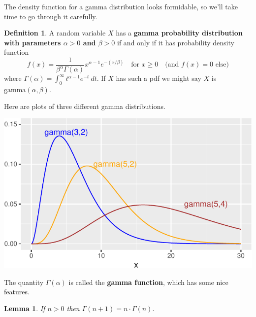 \documentclass[
]{book}
\newtheorem{lemma}{Lemma}[chapter]
\theoremstyle{definition}
\newtheorem{definition}{Definition}[chapter]
\theoremstyle{definition}
\theoremstyle{definition}
\theoremstyle{definition}
\theoremstyle{remark}
\begin{document}
The density function for a gamma distribution looks formidable, so we'll take time to go through it carefully.

\begin{definition}
\protect\hypertarget{def:gamma-distribution}{}\label{def:gamma-distribution}A random variable \(X\) has a \textbf{gamma probability distribution with parameters \(\alpha>0\) and \(\beta>0\)} if and only if it has probability density function
\[
f(x)=
\frac{1}{\beta^\alpha \Gamma(\alpha)}x^{\alpha-1}e^{-(x/\beta)}~~~ \text{ for }x \geq 0~~~ \text{ (and }f(x) = 0\text{ else)}
\]
where \(\displaystyle\Gamma(\alpha) = \int_0^\infty t^{\alpha-1}e^{-t}~dt\).
If \(X\) has such a pdf we might say \(X\) is \(\text{gamma}(\alpha,\beta)\).
\end{definition}

Here are plots of three different gamma distributions.

\begin{center}\includegraphics{math340-notes_files/figure-latex/unnamed-chunk-23-1} \end{center}

The quantity \(\Gamma(\alpha)\) is called the \textbf{gamma function}, which has some nice features.

\begin{lemma}
\protect\hypertarget{lem:gamma-fcn-ind-step}{}\label{lem:gamma-fcn-ind-step}If \(n > 0\) then \(\Gamma(n+1) = n \cdot \Gamma(n).\)
\end{lemma}
\end{document}

